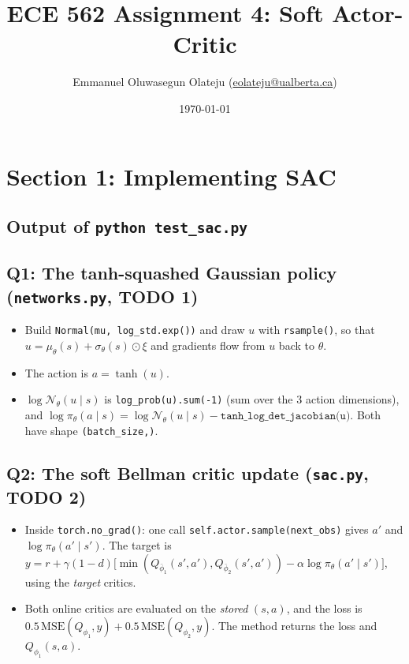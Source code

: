 \documentclass[11pt]{article}
\title{ECE 562 Assignment 4: Soft Actor-Critic}
\author{Emmanuel Oluwasegun Olateju (\href{mailto:eolateju@ualberta.ca}{eolateju@ualberta.ca})}
\date{\today}
\newcommand{\code}[1]{\texttt{#1}}
\begin{document}
\maketitle

\section*{Section 1: Implementing SAC}

\subsection*{Output of \code{python test\_sac.py}}


\subsection*{Q1: The tanh-squashed Gaussian policy (\code{networks.py}, TODO 1)}
\begin{itemize}
  \item Build \code{Normal(mu, log\_std.exp())} and draw $u$ with \code{rsample()}, so that
        $u=\mu_\theta(s)+\sigma_\theta(s)\odot\xi$ and gradients flow from $u$ back to $\theta$.
  \item The action is $a=\tanh(u)$.
  \item $\log\mathcal N_\theta(u\mid s)$ is \code{log\_prob(u).sum(-1)} (sum over the 3 action dimensions),
        and $\log\pi_\theta(a\mid s)=\log\mathcal N_\theta(u\mid s)-\code{tanh\_log\_det\_jacobian(u)}$.
        Both have shape \code{(batch\_size,)}.
\end{itemize}

\subsection*{Q2: The soft Bellman critic update (\code{sac.py}, TODO 2)}
\begin{itemize}
  \item Inside \code{torch.no\_grad()}: one call \code{self.actor.sample(next\_obs)} gives $a'$ and
        $\log\pi_\theta(a'\mid s')$. The target is
        $y=r+\gamma(1-d)\big[\min(Q_{\bar\phi_1}(s',a'),Q_{\bar\phi_2}(s',a'))-\alpha\log\pi_\theta(a'\mid s')\big]$,
        using the \emph{target} critics.
  \item Both online critics are evaluated on the \emph{stored} $(s,a)$, and the loss is
        $0.5\,\mathrm{MSE}(Q_{\phi_1},y)+0.5\,\mathrm{MSE}(Q_{\phi_2},y)$. The method returns the loss and
        $Q_{\phi_1}(s,a)$.
\end{itemize}
\end{document}
